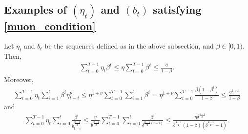 \documentclass[twoside,11pt]{article}
\begin{document}
\subsection{Examples of $(\eta_t)$ and $(b_t)$ satisfying \eqref{muon_condition}}
Let $\eta_t$ and $b_t$ be the sequences defined as in the above subsection, and $\beta \in [0,1)$. Then,
\begin{align*}
\sum_{t=0}^{T-1} \eta_t \beta^t
\leq \eta \sum_{t=0}^{T-1} \beta^t
\leq \frac{\eta}{1 - \beta}. 
\end{align*}
Moreover,
\begin{align*}
\sum_{t=0}^{T-1} \eta_t \sum_{i=1}^t \beta^i \eta_{t-i}^\nu
\leq
\eta^{1+\nu} \sum_{t=0}^{T-1} \sum_{i=1}^t \beta^i
= 
\eta^{1+\nu}
\sum_{t=0}^{T-1} \frac{\beta (1 - \beta^t)}{1 - \beta}
\leq  
\frac{\eta^{1+\nu}}{1 - \beta}
\end{align*}
and
\begin{align*} 
\sum_{t=0}^{T-1} \eta_t \sum_{i=0}^t \frac{\beta^i}{b_{t-i}^{\frac{\mathfrak{p} -1}{\mathfrak{p}}}} 
\leq 
\frac{\eta}{b^{\frac{\mathfrak{p} - 1}{\mathfrak{p}}}} \sum_{t=0}^{T-1}  \sum_{i=0}^t \frac{\beta^i}{\delta^{\frac{\mathfrak{p} -1}{\mathfrak{p}}(t-i)}}
\leq 
\frac{\eta \delta^{\frac{\mathfrak{p} - 1}{\mathfrak{p}}}}{b^{\frac{\mathfrak{p} - 1}{\mathfrak{p}}}(1 - \beta)(\delta^{\frac{\mathfrak{p} - 1}{\mathfrak{p}}} -1)}.
\end{align*}

\vskip 0.2in

\end{document}
